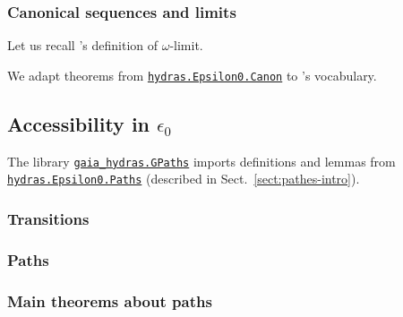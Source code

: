 



\subsubsection{Canonical sequences and limits}


Let us recall \gaia's definition of $\omega$-limit.


We adapt theorems from \href{../theories/html/hydras.Epsilon0.Canon.html}%
{\texttt{hydras.Epsilon0.Canon}} to \gaia's vocabulary.


\subsection{Accessibility in \texorpdfstring{$\epsilon_0$}{epsilon\_0}}
\label{sect:gpath}

The library \href{../theories/html/gaia_hydras.GPaths.html}%
{\texttt{gaia\_hydras.GPaths}} imports definitions and lemmas from
\href{../theories/html/hydras.Epsilon0.Paths.html}%
{\texttt{hydras.Epsilon0.Paths}} (described in Sect.~\ref{sect:pathes-intro}).


\subsubsection{Transitions}
  

\subsubsection{Paths}


\subsubsection{Main theorems about paths}

